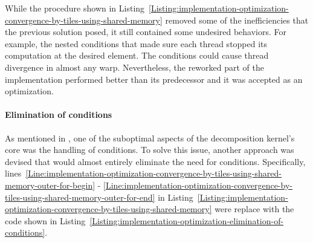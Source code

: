 While the procedure shown in Listing~\ref{Listing:implementation-optimization-convergence-by-tiles-using-shared-memory} removed some of the inefficiencies that the previous solution posed, it still contained some undesired behaviors. For example, the nested conditions that made sure each thread stopped its computation at the desired element. The conditions could cause thread divergence in almost any warp. Nevertheless, the reworked part of the implementation performed better than its predecessor and it was accepted as an optimization.

\paragraph{Elimination of conditions}\label{Paragraph:implementation-optimization-elimination-of-conditions}
As mentioned in \textit{}, one of the suboptimal aspects of the decomposition kernel's core was the handling of conditions. To solve this issue, another approach was devised that would almost entirely eliminate the need for conditions. Specifically, lines~\ref{Line:implementation-optimization-convergence-by-tiles-using-shared-memory-outer-for-begin} - \ref{Line:implementation-optimization-convergence-by-tiles-using-shared-memory-outer-for-end} in Listing~\ref{Listing:implementation-optimization-convergence-by-tiles-using-shared-memory} were replace with the code shown in Listing~\ref{Listing:implementation-optimization-elimination-of-conditions}.

